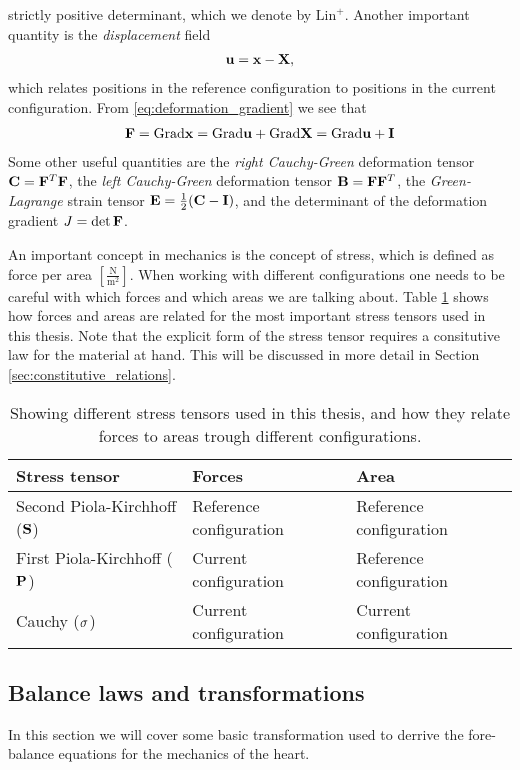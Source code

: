 strictly positive determinant, which we denote by
$\mathrm{Lin}^+$. Another important quantity is the
\emph{displacement} field  
\begin{align}
  \mathbf{u} = \mathbf{x}-\mathbf{X}, 
  \label{eq:displacement}
\end{align}
which relates positions in the reference configuration to positions
in the current configuration. From \eqref{eq:deformation_gradient} we
see that
\begin{align}
  \mathbf{F} = \mathrm{Grad} \mathbf{x} = \mathrm{Grad} \mathbf{u} + \mathrm{Grad} \mathbf{X} = \mathrm{Grad} \mathbf{u} + \mathbf{I}
\end{align}
Some other useful quantities are the \emph{right Cauchy-Green} deformation
tensor $\mathbf{C} = \mathbf{F}^T\mathbf{F}$, the \emph{left Cauchy-Green} deformation tensor
$\mathbf{B} = \mathbf{F}\mathbf{F}^T$, the \emph{Green-Lagrange} strain tensor
$\mathbf{E} = \frac{1}{2}(\mathbf{C} - \mathbf{I})$, and the determinant of the
deformation gradient $J = \det \mathbf{F}$.

An important concept in mechanics is the concept of stress, which is
defined as force per area
$\left[\frac{\mathrm{N}}{\mathrm{m}^2}\right]$. When working with
different configurations one needs to be careful with which forces and
which areas we are talking about. Table \ref{tab:stress_tensor}
shows how forces and areas are related for the most important stress
tensors used in this thesis. Note that the explicit form of the stress
tensor requires a consitutive law for the material at hand. This will
be discussed in more detail in Section \ref{sec:constitutive_relations}.

\begin{table}[h]
  \centering
  \begin{tabular}{lll}
    \toprule
    Stress tensor & Forces & Area \\
    \midrule
    Second Piola-Kirchhoff ($\mathbf{S}$) & Reference configuration & Reference configuration \\
    First Piola-Kirchhoff ($\mathbf{P}$) & Current configuration  &  Reference configuration \\
    Cauchy ($\mathbf{\sigma}$) &  Current configuration & Current configuration  \\
    \bottomrule
  \end{tabular}
  \caption{\label{tab:stress_tensor}Showing different stress tensors
    used in this thesis, and how
    they relate forces to areas trough different configurations.}
\end{table}


\subsection{Balance laws and transformations}
In this section we will cover some basic transformation used to
derrive the fore-balance equations for the mechanics of the heart. 

